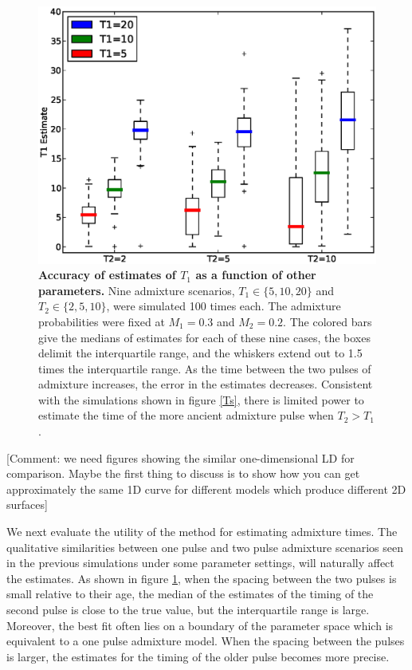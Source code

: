 \begin{figure}
\includegraphics[scale=.6]{estimates.eps}
\caption{
{\bf Accuracy of estimates of $T_1$ as a function of other parameters.} Nine admixture scenarios, $T_1\in \{5,10,20\}$ and $T_2\in\{2,5,10\}$, were simulated 100 times each. The admixture probabilities were fixed at $M_1=0.3$ and $M_2=0.2$. The colored bars give the medians of estimates for each of these nine cases, the boxes delimit the interquartile range, and the whiskers extend out to 1.5 times the interquartile range. As the time between the two pulses of admixture increases, the error in the estimates decreases. Consistent with the simulations shown in figure \ref{Ts}, there is limited power to estimate the time of the more ancient admixture pulse when $T_2>T_1$.
}
\label{estimates}
\end{figure}

[Comment: we need  figures showing the similar one-dimensional LD for comparison.  Maybe the first thing to discuss is to show how you can get approximately the same 1D curve for different models which produce different 2D surfaces]

We next evaluate the utility of the method for estimating admixture times.  The qualitative similarities between one pulse and two pulse admixture scenarios seen in the previous  simulations under some parameter settings, will naturally affect  the estimates. As shown in figure \ref{estimates}, when the spacing between the two pulses is small relative to their age, the median of the estimates of the timing of the second pulse is close to the true value, but the interquartile range is large. Moreover, the best fit often lies on a boundary of the parameter space which is equivalent to a one pulse admixture model. When the spacing between the pulses is larger, the estimates for the timing of the older pulse becomes more precise.

